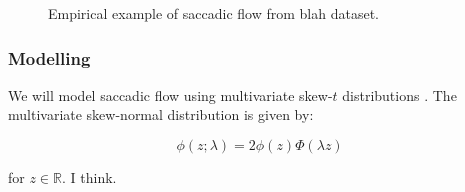 \documentclass[a4paper, onecolumn, oneside, 11pt]{article}
\begin{document}
\begin{figure}
[insert example image here]
\caption{Empirical example of saccadic flow from blah dataset.}
\label{fig:exampleSaccadic Flow}
\end{figure}

\subsubsection{Modelling}

We will model saccadic flow using multivariate skew-$t$ distributions \citep{azzalini2015}. The multivariate skew-normal distribution \citep{azzalini1996} is given by:

\begin{equation}
\phi(z; \lambda) = 2\phi(z)\Phi(\lambda z) 
\end{equation}

for $z \in \mathbb{R}$. I think. 
\end{document}
